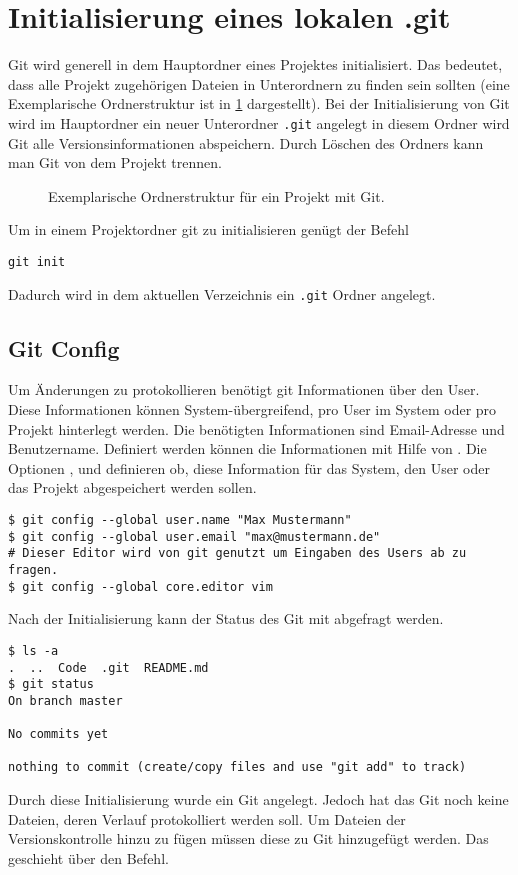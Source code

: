 \section{Initialisierung eines lokalen .git}
Git wird generell in dem Hauptordner eines Projektes initialisiert. Das bedeutet, dass alle Projekt zugehörigen Dateien in Unterordnern zu finden sein sollten (eine Exemplarische Ordnerstruktur ist in \ref{fig:dir_struc} dargestellt). Bei der Initialisierung von Git wird im Hauptordner ein neuer Unterordner  \lstinline[style=inline]{.git} angelegt in diesem Ordner wird Git alle Versionsinformationen abspeichern. Durch Löschen des Ordners kann man Git von dem Projekt trennen.
\begin{figure}[!h]
    \caption{Exemplarische Ordnerstruktur für ein Projekt mit Git.}
    \label{fig:dir_struc}
\end{figure}

Um in einem Projektordner git zu initialisieren genügt der Befehl 
\begin{lstlisting}[style=my]
git init
\end{lstlisting}
Dadurch wird in dem aktuellen Verzeichnis ein \lstinline[style=inline]{.git} Ordner angelegt.
\subsection{Git Config}
Um Änderungen zu protokollieren benötigt git Informationen über den User. Diese Informationen können System-übergreifend, pro User im System oder pro Projekt hinterlegt werden. Die benötigten Informationen sind Email-Adresse und Benutzername. Definiert werden können die Informationen mit Hilfe von . Die Optionen ,  und  definieren ob, diese Information für das System, den User oder das Projekt abgespeichert werden sollen.
\begin{lstlisting}
$ git config --global user.name "Max Mustermann"
$ git config --global user.email "max@mustermann.de"
# Dieser Editor wird von git genutzt um Eingaben des Users ab zu fragen.
$ git config --global core.editor vim  
\end{lstlisting}
Nach der Initialisierung kann der Status des Git mit  abgefragt werden.
\begin{lstlisting}
$ ls -a
.  ..  Code  .git  README.md
$ git status
On branch master

No commits yet

nothing to commit (create/copy files and use "git add" to track)
\end{lstlisting}
Durch diese Initialisierung wurde ein Git angelegt. Jedoch hat das Git noch keine Dateien, deren Verlauf protokolliert werden soll. Um Dateien der Versionskontrolle hinzu zu fügen müssen diese zu Git hinzugefügt werden. Das geschieht über den  Befehl.
